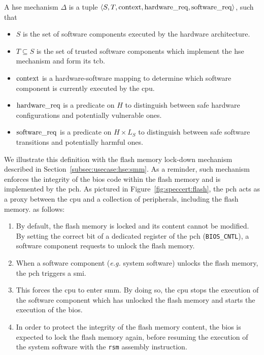 \begin{definition}
  \label{def:speccert:hse}
  A \ac{hse} mechanism $\Delta$ is a tuple
  $\langle S, T, \mathrm{context}, \mathrm{hardware\_req}, \mathrm{software\_req}
  \rangle$, such that
  \begin{itemize}
  \item $S$ is the set of software components executed by the hardware
    architecture.
  \item $T \subseteq S$ is the set of trusted software components which
    implement the \ac{hse} mechanism and form its \ac{tcb}.
  \item $\mathrm{context}$ is a hardware-software mapping to determine which
    software component is currently executed by the \ac{cpu}.
  \item $\mathrm{hardware\_req}$ is a predicate on $H$ to distinguish between safe
    hardware configurations and potentially vulnerable ones.
  \item $\mathrm{software\_req}$ is a predicate on $H \times L_S$ to distinguish
    between safe software transitions and potentially harmful ones. 
  \end{itemize}
\end{definition}

We illustrate this definition with the flash memory lock-down mechanism
described in Section~\ref{subsec:usecase:hse:smm}.
%
As a reminder, such mechanism enforces the integrity of the \ac{bios} code
within the flash memory and is implemented by the \ac{pch}.
%
As pictured in Figure~\ref{fig:speccert:flash}, the \ac{pch} acts as a proxy
between the \ac{cpu} and a collection of peripherals, including the flash
memory.
%
as follows: 
%
\begin{enumerate}
\item By default, the flash memory is locked and its content cannot be modified.
  By setting the correct bit of a dedicated register of the \ac{pch}
  (\texttt{BIOS\_CNTL}), a software component requests to unlock the flash
  memory.
%
\item When a software component (\emph{e.g.} system software) unlocks the flash
  memory, the \ac{pch} triggers a \ac{smi}.
%
\item This forces the \ac{cpu} to enter \ac{smm}.
  By doing so, the \ac{cpu} stops the execution of the software component which
  has unlocked the flash memory and starts the execution of the \ac{bios}.
%
\item In order to protect the integrity of the flash memory content, the
  \ac{bios} is expected to lock the flash memory again, before resuming the
  execution of the system software with the \texttt{rsm} assembly
  instruction. 
\end{enumerate}

